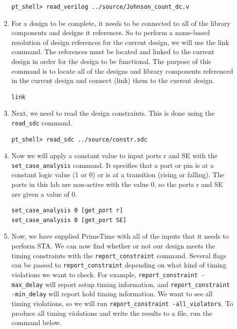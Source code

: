 \documentclass[a4paper,12pt,twoside]{article}
\begin{document}
\begin{enumerate}
\begin{enumerate}
        \begin{verbatim}
pt_shell> read_verilog ../source/Johnson_count_dc.v
        \end{verbatim}
        \item For a design to be complete, it needs to be connected to all of the library components and designs it references. So to perform a name-based resolution of design references for the current design, we will use the link command. The references must be located and linked to the current design in order for the design to be functional. The purpose of this command is to locate all of the designs and library components referenced in the current design and connect (link) them to the current design.
        \begin{verbatim}
link
        \end{verbatim}
        \item Next, we need to read the design constraints. This is done using the \texttt{read\_sdc} command.
        \begin{verbatim}
pt_shell> read_sdc ../source/constr.sdc
        \end{verbatim}
        \item Now we will apply a constant value to input ports r and SE with the \texttt{set\_case\_analysis} command. It specifies that a port or pin is at a constant logic value (1 or 0) or is at a transition (rising or falling). The ports in this lab are non-active with the value 0, so the ports r and SE are given a value of 0.
        \begin{verbatim}
set_case_analysis 0 [get_port r]
set_case_analysis 0 [get_port SE]
        \end{verbatim}
        \item Now, we have supplied PrimeTime with all of the inputs that it needs to perform STA. We can now find whether or not our design meets the timing constraints with the \texttt{report\_constraint} command. Several flags can be passed to \texttt{report\_constraint} depending on what kind of timing violations we want to check. For example, \texttt{report\_constraint -max\_delay} will report setup timing information, and \texttt{report\_constraint -min\_delay} will report hold timing information. We want to see all timing violations, so we will run \texttt{report\_constraint -all\_violators}. To produce all timing violations and write the results to a file, run the command below.
        \begin{verbatim}

\end{verbatim}
\end{enumerate}
\end{enumerate}
\end{document}
